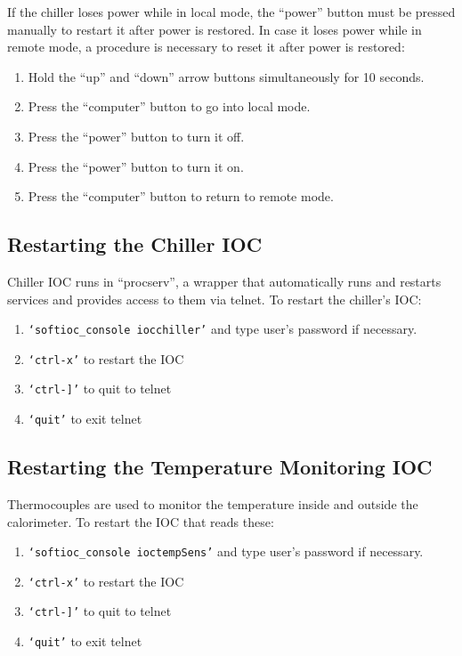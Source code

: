 \documentclass[12pt]{article}
\begin{document}
     If the chiller loses power while in local mode, the ``power'' button must be pressed manually to restart it after power is restored.  In case it loses power while in remote mode, a procedure is necessary to reset it after power is restored:
   {\footnotesize
     \begin{enumerate}
         \item Hold the ``up'' and ``down'' arrow buttons simultaneously for 10 seconds.
         \item Press the ``computer'' button to go into local mode.
         \item Press the ``power'' button to turn it off.
         \item Press the ``power'' button to turn it on.
         \item Press the ``computer'' button to return to remote mode.
    \end{enumerate}
    }

    \subsection{Restarting the Chiller IOC}
    Chiller IOC runs in ``procserv'', a wrapper that automatically runs and restarts services and provides access to them via telnet.  To restart the chiller's IOC:
   {\footnotesize
   \begin{enumerate}
       \item \texttt{`softioc\_console iocchiller'} and type user's password if necessary.
       \item \texttt{`ctrl-x'} to restart the IOC
       \item \texttt{`ctrl-]'} to quit to telnet
       \item \texttt{`quit'} to exit telnet
   \end{enumerate}
   }

   \subsection{Restarting the Temperature Monitoring IOC}
   Thermocouples are used to monitor the temperature inside and outside the calorimeter.  To restart the IOC that reads these:
   {\footnotesize
   \begin{enumerate}
       \item \texttt{`softioc\_console ioctempSens'} and type user's password if necessary.
       \item \texttt{`ctrl-x'} to restart the IOC
       \item \texttt{`ctrl-]'} to quit to telnet
       \item \texttt{`quit'} to exit telnet
   \end{enumerate}
   }
\end{document}
